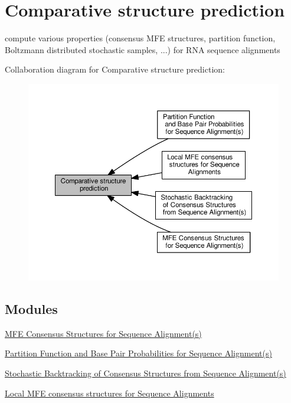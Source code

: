 \hypertarget{group__consensus__fold}{}\section{Comparative structure prediction}
\label{group__consensus__fold}


compute various properties (consensus M\+FE structures, partition function, Boltzmann distributed stochastic samples, ...) for R\+NA sequence alignments  


Collaboration diagram for Comparative structure prediction\+:
\nopagebreak
\begin{figure}[H]
\begin{center}
\leavevmode
\includegraphics[width=350pt]{group__consensus__fold}
\end{center}
\end{figure}
\subsection*{Modules}
\begin{DoxyCompactItemize}
\item 
\hyperlink{group__consensus__mfe__fold}{M\+F\+E Consensus Structures for Sequence Alignment(s)}
\item 
\hyperlink{group__consensus__pf__fold}{Partition Function and Base Pair Probabilities for Sequence Alignment(s)}
\item 
\hyperlink{group__consensus__stochbt}{Stochastic Backtracking of Consensus Structures from Sequence Alignment(s)}
\item 
\hyperlink{group__local__consensus__fold}{Local M\+F\+E consensus structures for Sequence Alignments}
\end{DoxyCompactItemize}
